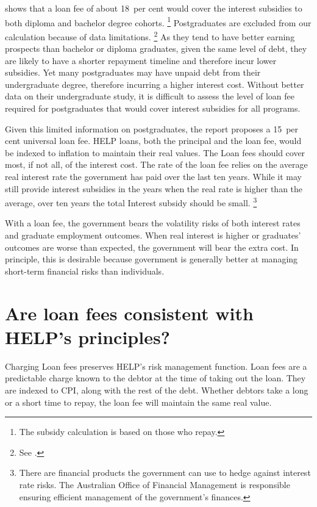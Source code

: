 \documentclass[embargoed]{grattan}
\begin{document}
 shows that a loan fee of about 18~per cent would cover the interest subsidies to both diploma and bachelor degree cohorts.%
\footnote{The subsidy calculation is based on those who repay.} Postgraduates are excluded from our calculation because of data limitations.%
\footnote{See .} As they tend to have better earning prospects than bachelor or diploma graduates, given the same level of debt, they are likely to have a shorter repayment timeline and therefore incur lower subsidies.
Yet many postgraduates may have unpaid debt from their undergraduate degree, therefore incurring a higher interest cost.
Without better data on their undergraduate study, it is difficult to assess the level of loan fee required for postgraduates that would cover interest subsidies for all programs.

Given this limited information on postgraduates, the report proposes a 15~per cent universal loan fee.
\gls{HELP} loans, both the principal and the loan fee, would be indexed to inflation to maintain their real values.
The \gls{Loan fees} should cover most, if not all, of the interest cost.
The rate of the loan fee relies on the average real interest rate the government has paid over the last ten years.
While it may still provide interest subsidies in the years when the real rate is higher than the average, over ten years the total \gls{Interest subsidy} should be small.%
\footnote{There are financial products the government can use to hedge against interest rate risks.
The Australian Office of Financial Management is responsible ensuring efficient management of the government's finances.}

With a loan fee, the government bears the volatility risks of both interest rates and graduate employment outcomes.
When real interest is higher or graduates' outcomes are worse than expected, the government will bear the extra cost.
In principle, this is desirable because government is generally better at managing short-term financial risks than individuals.

\section[Are loan fees consistent with {HELP}'s principles?]{Are loan fees consistent with \gls{HELP}'s principles?}\label{are-loan-fees-consistent-with-helps-principles}

Charging \gls{Loan fees} preserves \gls{HELP}'s risk management function.
\Gls{Loan fees} are a predictable charge known to the debtor at the time of taking out the loan.
They are indexed to \gls{CPI}, along with the rest of the debt.
Whether debtors take a long or a short time to repay, the loan fee will maintain the same real value.
\end{document}
